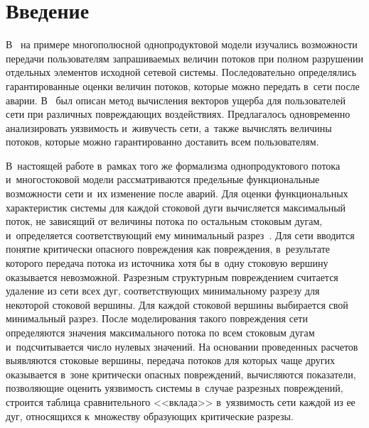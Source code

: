 
  



\thispagestyle{headings}

\begin{multicols}{2}

\label{st\stat}


\section{Введение}

В~\cite{MalInf17} на примере многополюсной однопродуктовой модели изучались
 возможности передачи пользователям запрашиваемых величин потоков при полном 
 разрушении отдельных элементов исходной сетевой системы. Последовательно 
 определялись гарантированные оценки величин потоков, которые можно передать в~сети 
 после аварии. В~\cite{MalInf181} был описан  метод  вычисления  векторов ущерба 
 для пользователей сети при различных по\-вреж\-да\-ющих воздействиях. 
 Предлагалось одновременно анализировать уязвимость и~живучесть  сети, а~также 
 вычислять величины потоков, которые можно гарантированно доставить всем пользователям.

В~настоящей работе в~рамках того же формализма однопродуктового потока и~многосто\-ковой 
модели рассматриваются предельные функ\-циональные возможности сети и~их изменение\linebreak 
после \mbox{аварий}. Для оценки функциональных характеристик сис\-те\-мы  для каждой 
стоковой дуги вычисляется максимальный поток, не зависящий от величины потока 
по остальным стоковым дугам, и~определяется соответствующий ему минимальный 
разрез~\cite{ford}. Для сети вводится понятие критически опасного по\-вреж\-де\-ния 
как по\-вреж\-де\-ния, в~результате которого передача потока из источника хотя бы в~одну 
стоковую вершину оказывается невозможной. Разрезным структурным по\-вреж\-де\-ни\-ем 
считается удаление из сети всех дуг, соответствующих минимальному разрезу для 
некоторой стоковой вершины. Для каждой стоковой вершины выбирается свой 
минимальный разрез. После моделирования такого по\-вреж\-де\-ния сети определяются 
значения максимального потока по всем стоковым дугам и~подсчитывается 
число нулевых значений. На основании проведенных расчетов выявляются 
стоковые вершины, передача потоков для которых чаще других оказывается в~зоне 
критически опасных по\-вреж\-де\-ний, вычисляются показатели, позволяющие оценить 
уязвимость системы в~случае разрезных по\-вреж\-де\-ний, строится таб\-ли\-ца сравнительного 
<<вклада>> в~уязвимость сети каждой из ее дуг, относящихся к~множеству обра\-зу\-ющих 
критические разрезы.


\end{multicols}
